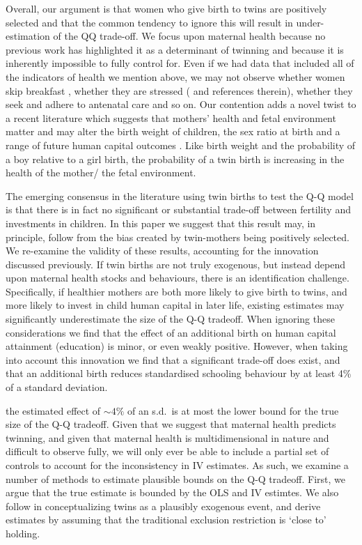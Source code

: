 Overall, our argument is that women who give birth to twins are positively selected and 
that the common tendency to ignore this will result in under-estimation of the QQ 
trade-off. We focus upon maternal health because no previous work has highlighted it 
as a determinant of twinning and because it is inherently impossible to fully control 
for. Even if we had data that included all of the indicators of health we mention 
above, we may not observe whether women skip breakfast \citep{MazumderSeeskin2014}, 
whether they are stressed (\citet{Blacketal2014} and references therein), whether they 
seek and adhere to antenatal care and so on.  Our contention adds a novel twist to a 
recent literature which suggests that mothers' health and fetal environment matter and 
may alter the birth weight of children, the sex ratio at birth and a range of future 
human capital outcomes \citep{Almondetal2011,BhalotraRawlings2013,Barker1995}. Like 
birth weight and the probability of a boy relative to a girl birth, the probability 
of a twin birth is increasing in the health of the mother/ the fetal environment.  

The emerging consensus in the literature using twin births to test the Q-Q model is 
that there is in fact no significant or substantial trade-off between fertility and 
investments in children. In this paper we suggest that this result may, in principle, 
follow from the bias created by twin-mothers being positively selected. We re-examine 
the validity of these results, accounting for the innovation discussed previously.
If twin births are not truly exogenous, but instead depend upon maternal health stocks 
and behaviours, there is an identification challenge.  Specifically, if healthier 
mothers are both more likely to give birth to twins, and more likely to invest in child 
human capital in later life, existing estimates may significantly underestimate the
size of the Q-Q tradeoff.  When ignoring these considerations we find that the effect 
of an additional birth on human capital attainment (education) is minor, or even 
weakly positive. However, when taking into account this innovation we find that a 
significant trade-off does exist, and that an additional birth reduces standardised 
schooling behaviour by at least 4\% of a standard deviation.

the estimated effect of $\sim 4\%$ of an s.d.\ is at most the lower bound for the true 
size of the Q-Q tradeoff. Given that we suggest that maternal health predicts twinning,
and given that maternal health is multidimensional in nature and difficult to observe 
fully, we will only ever be able to include a partial set of controls to account for 
the inconsistency in IV estimates. As such, we examine a number of methods to estimate 
plausible bounds on the Q-Q tradeoff. First, we argue that the true estimate is 
bounded by the OLS and IV estimtes. We also follow \citet{Conleyetal2012} in
conceptualizing twins as a plausibly exogenous event, and derive estimates by assuming 
that the traditional exclusion restriction is `close to' holding.

